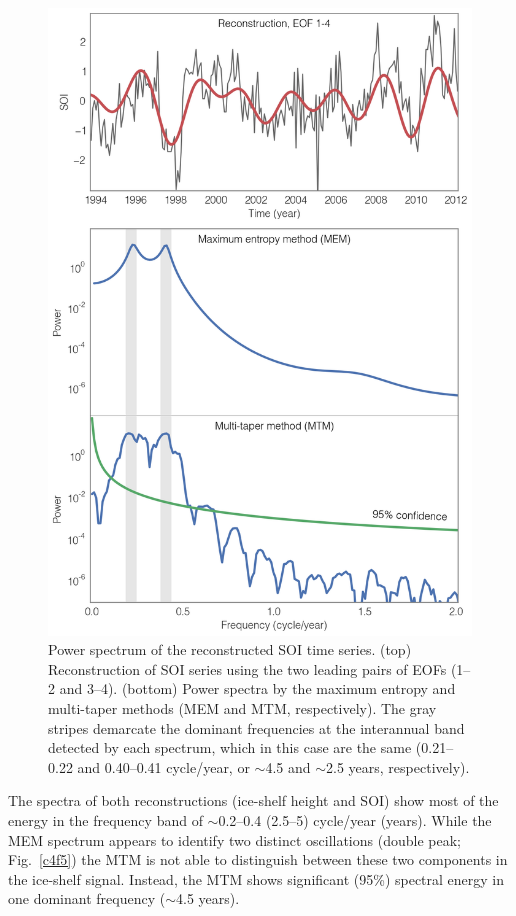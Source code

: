 \begin{figure}[!ht]
  \centering
  \includegraphics[width=.72\textwidth]{img/mem_mtm_soi_v2.png}
  \caption[Power spectrum of the reconstructed SOI time series]{
  \ssp \footnotesize
  Power spectrum of the reconstructed SOI time series. (top) Reconstruction of SOI series using the two leading pairs of EOFs (1--2 and 3--4). (bottom) Power spectra by the maximum entropy and multi-taper methods (MEM and MTM, respectively). The gray stripes demarcate the dominant frequencies at the interannual band detected by each spectrum, which in this case are the same (0.21--0.22 and 0.40--0.41 cycle/year, or $\sim$4.5 and $\sim$2.5 years, respectively).
  }
  \label{c4f8}
\end{figure}


The spectra of both reconstructions (ice-shelf height and SOI) show most of the energy in the frequency band of $\sim$0.2--0.4 (2.5--5) cycle/year (years). While the MEM spectrum appears to identify two distinct oscillations (double peak; Fig.~\ref{c4f5}) the MTM is not able to distinguish between these two components in the ice-shelf signal. Instead, the MTM shows significant (95\%) spectral energy in one dominant frequency ($\sim$4.5 years).

